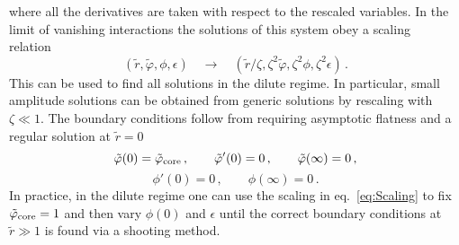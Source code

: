 \documentclass[11pt,a4paper]{article}
\begin{document}
where all the derivatives are taken with respect to the rescaled variables. In the limit of vanishing interactions the solutions of this system obey a scaling relation~\cite{Ruffini:1969qy}
\begin{equation}
\label{eq:Scaling}
\left(\tilde{r}, \tilde{\varphi}, \phi, \epsilon\right) \quad \longrightarrow \quad \left(\tilde{r}/\zeta, \zeta^2 \tilde{\varphi}, \zeta^2 \phi, \zeta^2 \epsilon\right) \,.
\end{equation}
This can be used to find all solutions in the dilute regime. In particular, small amplitude solutions can be obtained from generic solutions by rescaling with $\zeta \ll 1$. The boundary conditions follow from requiring asymptotic flatness and a regular solution at $\tilde{r} = 0$
\begin{equation}
\label{eq:BCvarphi0}
\tilde\varphi(0) = \tilde\varphi_{\rm core} \,, \qquad \tilde\varphi'(0) = 0 \,, \qquad \tilde\varphi(\infty) = 0 \,,
\end{equation}
\begin{equation}
\label{eq:BCphip0}
\phi'(0) = 0 \,, \qquad \phi(\infty) = 0 \,.
\end{equation}
In practice, in the dilute regime one can use the scaling in eq.~\eqref{eq:Scaling} to fix $\tilde\varphi_{\rm core} = 1$ and then vary $\phi(0)$ and $\epsilon$ until the correct boundary conditions at $\tilde{r} \gg 1$ is found via a shooting method.\\
\end{document}
